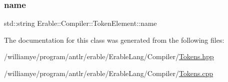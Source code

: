 \subsubsection{\texorpdfstring{name}{name}}
{\footnotesize\ttfamily std\+::string Erable\+::\+Compiler\+::\+Token\+Element\+::name\hspace{0.3cm}{\ttfamily [protected]}}



The documentation for this class was generated from the following files\+:\begin{DoxyCompactItemize}
\item 
/williamye/program/antlr/erable/\+Erable\+Lang/\+Compiler/\mbox{\hyperlink{_tokens_8hpp}{Tokens.\+hpp}}\item 
/williamye/program/antlr/erable/\+Erable\+Lang/\+Compiler/\mbox{\hyperlink{_tokens_8cpp}{Tokens.\+cpp}}\end{DoxyCompactItemize}
